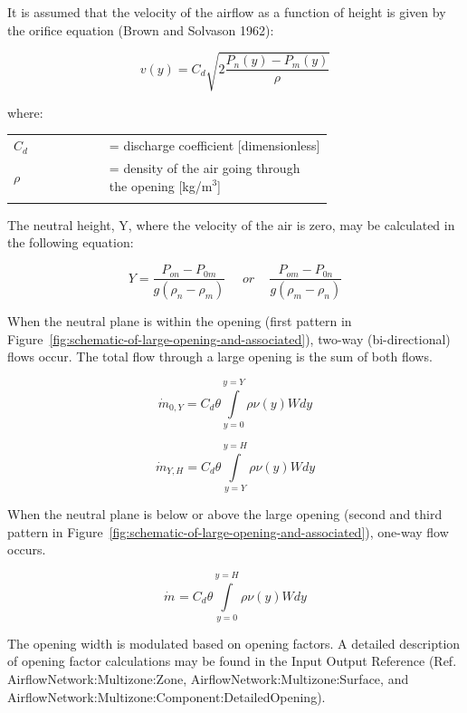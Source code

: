 It is assumed that the velocity of the airflow as a function of height is given by the orifice equation (Brown and Solvason 1962):

\begin{equation}
v(y) = {C_d}\sqrt {2\frac{{{P_n}(y) - {P_m}(y)}}{\rho }}
\end{equation}

where:

\begin{tabular}{lp{0.7\linewidth}}
\\
$C_d$ &= discharge coefficient [dimensionless] \\
$\rho$ &= density of the air going through the opening [kg/m\(^{3}\)] \\
\\
\end{tabular}

The neutral height, Y, where the velocity of the air is zero, may be calculated in the following equation:

\begin{equation}
Y = \frac{{{P_{on}} - {P_{0m}}}}{{g({\rho_n} - {\rho_m})}}\,\,\,\,\,\,\,\,or\,\,\,\,\,\,\,\frac{{{P_{om}} - {P_{0n}}}}{{g({\rho_m} - {\rho_n})}}
\end{equation}

When the neutral plane is within the opening (first pattern in Figure~\ref{fig:schematic-of-large-opening-and-associated}), two-way (bi-directional) flows occur. The total flow through a large opening is the sum of both flows.

\begin{equation}
{\dot m_{0,Y}} = {C_d}\theta \int\limits_{y = 0}^{y = Y} {\rho \nu (y)Wdy}
\end{equation}

\begin{equation}
{\dot m_{Y,H}} = {C_d}\theta \int\limits_{y = Y}^{y = H} {\rho \nu (y)Wdy}
\end{equation}

When the neutral plane is below or above the large opening (second and third pattern in Figure~\ref{fig:schematic-of-large-opening-and-associated}), one-way flow occurs.

\begin{equation}
{\dot m_{}} = {C_d}\theta \int\limits_{y = 0}^{y = H} {\rho \nu (y)Wdy}
\end{equation}

The opening width is modulated based on opening factors. A detailed description of opening factor calculations may be found in the Input Output Reference (Ref. AirflowNetwork:Multizone:Zone, AirflowNetwork:Multizone:Surface, and AirflowNetwork:Multizone:Component:DetailedOpening).

